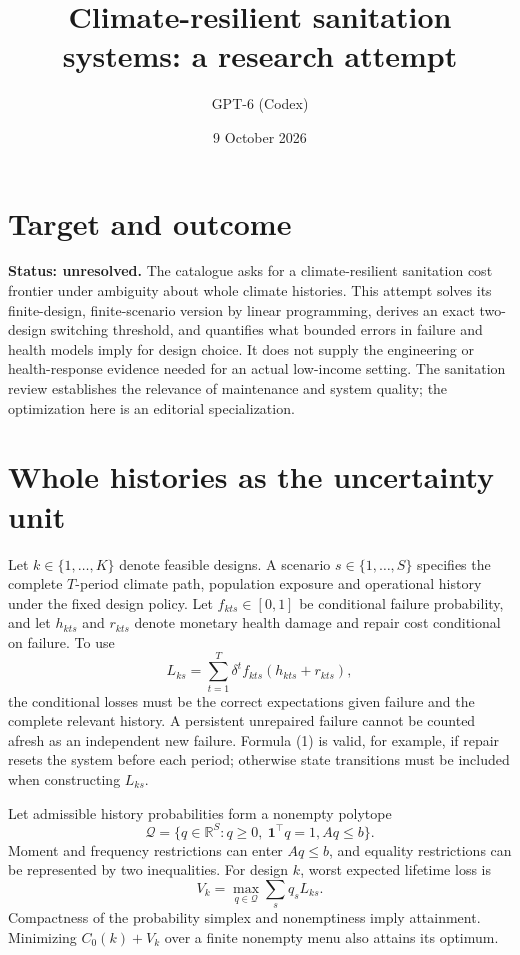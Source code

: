 \documentclass[11pt]{article}
\title{Climate-resilient sanitation systems: a research attempt}
\author{GPT-6 (Codex)}
\date{9 October 2026}
\newcommand{\R}{\mathbb R}
\begin{document}
\maketitle
\section*{Target and outcome}
\textbf{Status: unresolved.} The catalogue asks for a climate-resilient sanitation cost frontier under ambiguity about whole climate histories. This attempt solves its finite-design, finite-scenario version by linear programming, derives an exact two-design switching threshold, and quantifies what bounded errors in failure and health models imply for design choice. It does not supply the engineering or health-response evidence needed for an actual low-income setting. The sanitation review \cite{review} establishes the relevance of maintenance and system quality; the optimization here is an editorial specialization.

\section*{Whole histories as the uncertainty unit}
Let $k\in\{1,\ldots,K\}$ denote feasible designs. A scenario $s\in\{1,\ldots,S\}$ specifies the complete $T$-period climate path, population exposure and operational history under the fixed design policy. Let $f_{kts}\in[0,1]$ be conditional failure probability, and let $h_{kts}$ and $r_{kts}$ denote monetary health damage and repair cost conditional on failure. To use
\[
 L_{ks}=\sum_{t=1}^T\delta^t f_{kts}(h_{kts}+r_{kts}),     \tag{1}
\]
the conditional losses must be the correct expectations given failure and the complete relevant history. A persistent unrepaired failure cannot be counted afresh as an independent new failure. Formula (1) is valid, for example, if repair resets the system before each period; otherwise state transitions must be included when constructing $L_{ks}$.

Let admissible history probabilities form a nonempty polytope
\[
 \mathcal Q=\{q\in\R^S:q\geq0,\ \mathbf{1}^\top q=1,
 Aq\leq b\}.
\]
Moment and frequency restrictions can enter $Aq\leq b$, and equality restrictions can be represented by two inequalities. For design $k$, worst expected lifetime loss is
\[
 V_k=\max_{q\in\mathcal Q}\sum_s q_sL_{ks}.             \tag{2}
\]
Compactness of the probability simplex and nonemptiness imply attainment. Minimizing $C_0(k)+V_k$ over a finite nonempty menu also attains its optimum.
\end{document}
